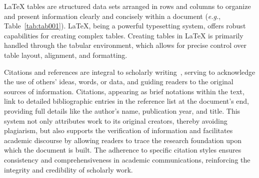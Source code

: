 
LaTeX tables are structured data sets arranged in rows and columns to organize and present information clearly and concisely within a document ({\it e.g.}, Table~\ref{tab:tab001}).
LaTeX, being a powerful typesetting system, offers robust capabilities for creating complex tables.
Creating tables in LaTeX is primarily handled through the tabular environment, which allows for precise control over table layout, alignment, and formatting.



Citations and references are integral to scholarly writing~\cite{Knuth1998}, serving to acknowledge the use of others' ideas, words, or data, and guiding readers to the original sources of information.
Citations, appearing as brief notations within the text, link to detailed bibliographic entries in the reference list at the document's end, providing full details like the author's name, publication year, and title.
This system not only attributes work to its original creators, thereby avoiding plagiarism, but also supports the verification of information and facilitates academic discourse by allowing readers to trace the research foundation upon which the document is built.
The adherence to specific citation styles ensures consistency and comprehensiveness in academic communications, reinforcing the integrity and credibility of scholarly work.